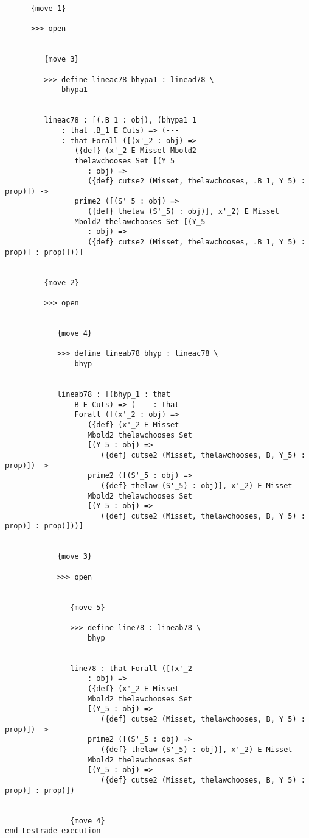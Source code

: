 \documentclass[12pt]{article}
\begin{document}
\begin{verbatim}
      {move 1}

      >>> open


         {move 3}

         >>> define lineac78 bhypa1 : linead78 \
             bhypa1


         lineac78 : [(.B_1 : obj), (bhypa1_1 
             : that .B_1 E Cuts) => (--- 
             : that Forall ([(x'_2 : obj) => 
                ({def} (x'_2 E Misset Mbold2 
                thelawchooses Set [(Y_5 
                   : obj) => 
                   ({def} cutse2 (Misset, thelawchooses, .B_1, Y_5) : prop)]) -> 
                prime2 ([(S'_5 : obj) => 
                   ({def} thelaw (S'_5) : obj)], x'_2) E Misset 
                Mbold2 thelawchooses Set [(Y_5 
                   : obj) => 
                   ({def} cutse2 (Misset, thelawchooses, .B_1, Y_5) : prop)] : prop)]))]


         {move 2}

         >>> open


            {move 4}

            >>> define lineab78 bhyp : lineac78 \
                bhyp


            lineab78 : [(bhyp_1 : that 
                B E Cuts) => (--- : that 
                Forall ([(x'_2 : obj) => 
                   ({def} (x'_2 E Misset 
                   Mbold2 thelawchooses Set 
                   [(Y_5 : obj) => 
                      ({def} cutse2 (Misset, thelawchooses, B, Y_5) : prop)]) -> 
                   prime2 ([(S'_5 : obj) => 
                      ({def} thelaw (S'_5) : obj)], x'_2) E Misset 
                   Mbold2 thelawchooses Set 
                   [(Y_5 : obj) => 
                      ({def} cutse2 (Misset, thelawchooses, B, Y_5) : prop)] : prop)]))]


            {move 3}

            >>> open


               {move 5}

               >>> define line78 : lineab78 \
                   bhyp


               line78 : that Forall ([(x'_2 
                   : obj) => 
                   ({def} (x'_2 E Misset 
                   Mbold2 thelawchooses Set 
                   [(Y_5 : obj) => 
                      ({def} cutse2 (Misset, thelawchooses, B, Y_5) : prop)]) -> 
                   prime2 ([(S'_5 : obj) => 
                      ({def} thelaw (S'_5) : obj)], x'_2) E Misset 
                   Mbold2 thelawchooses Set 
                   [(Y_5 : obj) => 
                      ({def} cutse2 (Misset, thelawchooses, B, Y_5) : prop)] : prop)])


               {move 4}
end Lestrade execution
\end{verbatim}
\end{document}
